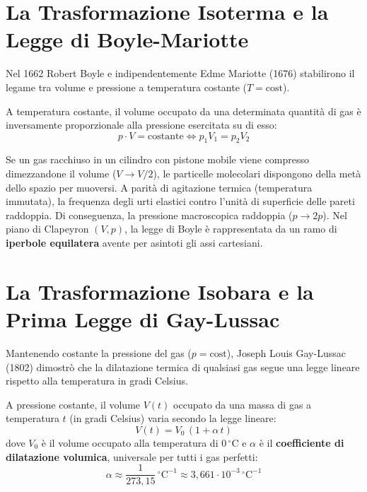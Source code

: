 \documentclass[11pt,a4paper,oneside]{report}
\begin{document}
\section{La Trasformazione Isoterma e la Legge di Boyle-Mariotte}
Nel 1662 Robert Boyle e indipendentemente Edme Mariotte (1676) stabilirono il legame tra volume e pressione a temperatura costante ($T = \text{cost}$).

\begin{leggefisica}
A temperatura costante, il volume occupato da una determinata quantità di gas è inversamente proporzionale alla pressione esercitata su di esso:
\[
p \cdot V = \text{costante} \iff p_1 V_1 = p_2 V_2
\]
\end{leggefisica}

\begin{commento}
Se un gas racchiuso in un cilindro con pistone mobile viene compresso dimezzandone il volume ($V \to V/2$), le particelle molecolari dispongono della metà dello spazio per muoversi. A parità di agitazione termica (temperatura immutata), la frequenza degli urti elastici contro l'unità di superficie delle pareti raddoppia. Di conseguenza, la pressione macroscopica raddoppia ($p \to 2p$). Nel piano di Clapeyron $(V, p)$, la legge di Boyle è rappresentata da un ramo di \textbf{iperbole equilatera} avente per asintoti gli assi cartesiani.
\end{commento}

\section{La Trasformazione Isobara e la Prima Legge di Gay-Lussac}
Mantenendo costante la pressione del gas ($p = \text{cost}$), Joseph Louis Gay-Lussac (1802) dimostrò che la dilatazione termica di qualsiasi gas segue una legge lineare rispetto alla temperatura in gradi Celsius.

\begin{leggefisica}
A pressione costante, il volume $V(t)$ occupato da una massa di gas a temperatura $t$ (in gradi Celsius) varia secondo la legge lineare:
\[
V(t) = V_0 \, (1 + \alpha \, t)
\]
dove $V_0$ è il volume occupato alla temperatura di $0\,{^\circ}\text{C}$ e $\alpha$ è il \textbf{coefficiente di dilatazione volumica}, universale per tutti i gas perfetti:
\[
\alpha \approx \frac{1}{273{,}15}\,{^\circ}\text{C}^{-1} \approx 3{,}661 \cdot 10^{-3}\,{^\circ}\text{C}^{-1}
\]
\end{leggefisica}
\end{document}
